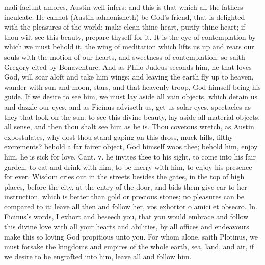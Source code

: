 {mali faciunt amores, Austin well infers: and this is that which all the
fathers inculcate. He cannot (Austin admonisheth) be God's
friend, that is delighted with the pleasures of the world: make clean
thine heart, purify thine heart; if thou wilt see this beauty, prepare
thyself for it. It is the eye of contemplation by which we must behold
it, the wing of meditation which lifts us up and rears our souls with
the motion of our hearts, and sweetness of contemplation: so saith
Gregory cited by Bonaventure. And as Philo Judeus seconds
him, he that loves God, will soar aloft and take him wings; and leaving
the earth fly up to heaven, wander with sun and moon, stars, and that
heavenly troop, God himself being his guide. If we desire to see him,
we must lay aside all vain objects, which detain us and dazzle our
eyes, and as Ficinus adviseth us, get us solar eyes, spectacles
as they that look on the sun: to see this divine beauty, lay aside all
material objects, all sense, and then thou shalt see him as he is. Thou
covetous wretch, as Austin expostulates, why dost thou stand
gaping on this dross, muck-hills, filthy excrements? behold a far
fairer object, God himself woos thee; behold him, enjoy him, he is sick
for love. Cant. v. he invites thee to his sight, to come into his fair
garden, to eat and drink with him, to be merry with him, to enjoy his
presence for ever. Wisdom cries out in the streets besides the
gates, in the top of high places, before the city, at the entry of the
door, and bids them give ear to her instruction, which is better than
gold or precious stones; no pleasures can be compared to it: leave all
then and follow her, vos exhortor o amici et obsecro. In.
Ficinus's words, I exhort and beseech you, that you would embrace
and follow this divine love with all your hearts and abilities, by all
offices and endeavours make this so loving God propitious unto you. For
whom alone, saith Plotinus, we must forsake the kingdoms and
empires of the whole earth, sea, land, and air, if we desire to be
engrafted into him, leave all and follow him.

}
